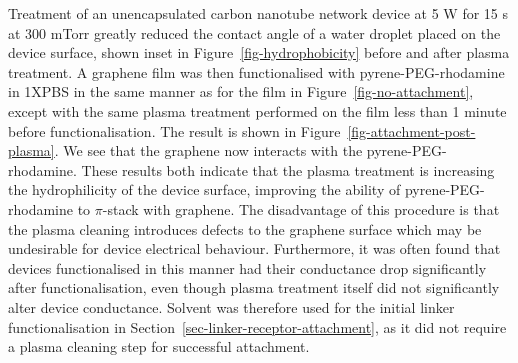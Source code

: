 \documentclass[
  a4paper,
]{scrbook}
\begin{document}
Treatment of an unencapsulated carbon nanotube network device at 5 W for
15 s at 300 mTorr greatly reduced the contact angle of a water droplet
placed on the device surface, shown inset in
Figure~\ref{fig-hydrophobicity} before and after plasma treatment. A
graphene film was then functionalised with pyrene-PEG-rhodamine in 1XPBS
in the same manner as for the film in Figure~\ref{fig-no-attachment},
except with the same plasma treatment performed on the film less than 1
minute before functionalisation. The result is shown in
Figure~\ref{fig-attachment-post-plasma}. We see that the graphene now
interacts with the pyrene-PEG-rhodamine. These results both indicate
that the plasma treatment is increasing the hydrophilicity of the device
surface, improving the ability of pyrene-PEG-rhodamine to \(\pi\)-stack
with graphene. The disadvantage of this procedure is that the plasma
cleaning introduces defects to the graphene surface which may be
undesirable for device electrical behaviour. Furthermore, it was often
found that devices functionalised in this manner had their conductance
drop significantly after functionalisation, even though plasma treatment
itself did not significantly alter device conductance. Solvent was
therefore used for the initial linker functionalisation in
Section~\ref{sec-linker-receptor-attachment}, as it did not require a
plasma cleaning step for successful attachment.
\end{document}
